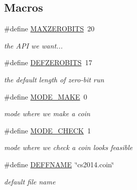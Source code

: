 \subsection*{Macros}
\begin{DoxyCompactItemize}
\item 
\#define \hyperlink{cs2014coin-main_8c_a27a1bcd135235e6fd1b52af23cb7886a}{M\+A\+X\+Z\+E\+R\+O\+B\+I\+TS}~20
\begin{DoxyCompactList}\small\item\em the A\+PI we want... \end{DoxyCompactList}\item 
\mbox{\label{cs2014coin-main_8c_a7405332bf1fd750e532b1e333cf41092}} 
\#define \hyperlink{cs2014coin-main_8c_a7405332bf1fd750e532b1e333cf41092}{D\+E\+F\+Z\+E\+R\+O\+B\+I\+TS}~17
\begin{DoxyCompactList}\small\item\em the default length of zero-\/bit run \end{DoxyCompactList}\item 
\mbox{\label{cs2014coin-main_8c_aca6b7654301c81946540a3f80694b140}} 
\#define \hyperlink{cs2014coin-main_8c_aca6b7654301c81946540a3f80694b140}{M\+O\+D\+E\+\_\+\+M\+A\+KE}~0
\begin{DoxyCompactList}\small\item\em mode where we make a coin \end{DoxyCompactList}\item 
\mbox{\label{cs2014coin-main_8c_a04b254126af7e934b608d6fc4f570518}} 
\#define \hyperlink{cs2014coin-main_8c_a04b254126af7e934b608d6fc4f570518}{M\+O\+D\+E\+\_\+\+C\+H\+E\+CK}~1
\begin{DoxyCompactList}\small\item\em mode where we check a coin looks feasible \end{DoxyCompactList}\item 
\mbox{\label{cs2014coin-main_8c_ad3abbe096450034083770ac55806d999}} 
\#define \hyperlink{cs2014coin-main_8c_ad3abbe096450034083770ac55806d999}{D\+E\+F\+F\+N\+A\+ME}~\char`\"{}cs2014.\+coin\char`\"{}
\begin{DoxyCompactList}\small\item\em default file name \end{DoxyCompactList}\end{DoxyCompactItemize}

